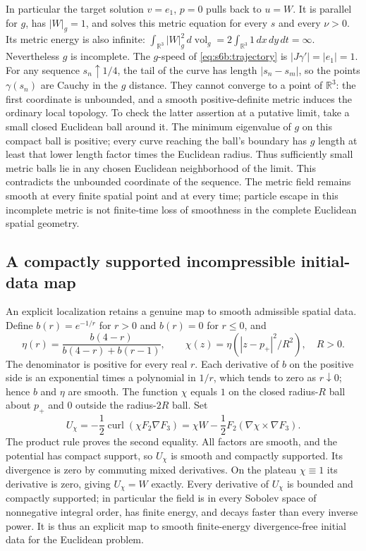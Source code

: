 In particular the target solution $v=e_1$, $p=0$ pulls back to $u=W$.
It is parallel for $g$, has $|W|_g=1$, and solves this metric equation for
every $s$ and every $\nu>0$.  Its metric energy is also infinite:
$\int_{\mathbb R^3}|W|_g^2\,d\operatorname{vol}_g
=2\int_{\mathbb R^3}1\,dx\,dy\,dt=\infty$.
Nevertheless $g$ is incomplete.  The
$g$-speed of \eqref{eq:s6b:trajectory} is
$|J\gamma'|=|e_1|=1$.  For any sequence $s_n\uparrow1/4$, the tail of
the curve has length $|s_n-s_m|$, so the points $\gamma(s_n)$ are Cauchy
in the $g$ distance.  They cannot converge to a point of $\mathbb R^3$:
the first coordinate is unbounded, and a smooth positive-definite metric
induces the ordinary local topology.  To check the latter assertion at a
putative limit, take a small closed Euclidean ball around it.  The minimum
eigenvalue of $g$ on this compact ball is positive; every curve reaching
the ball's boundary has $g$ length at least that lower length factor
times the Euclidean radius.  Thus sufficiently small metric balls lie
in any chosen Euclidean neighborhood of the limit.  This contradicts
the unbounded coordinate of the sequence.
The metric field remains smooth at every finite spatial point and at every
time; particle escape in this incomplete metric is not finite-time loss
of smoothness in the complete Euclidean spatial geometry.

\subsection{A compactly supported incompressible initial-data map}
An explicit localization retains a genuine map to smooth admissible spatial
data.  Define $b(r)=e^{-1/r}$ for $r>0$ and $b(r)=0$ for $r\le0$, and
\[
 \eta(r)=\frac{b(4-r)}{b(4-r)+b(r-1)},\qquad
 \chi(z)=\eta(|z-p_+|^2/R^2),\quad R>0.
\]
The denominator is positive for every real $r$.  Each derivative of $b$
on the positive side is an exponential times a polynomial in $1/r$,
which tends to zero as $r\downarrow0$; hence $b$ and $\eta$ are smooth.
The function $\chi$ equals $1$ on the closed radius-$R$ ball about $p_+$
and $0$ outside the radius-$2R$ ball.  Set
\begin{equation}
 U_\chi=-\frac12\operatorname{curl}(\chi F_2\nabla F_3)
 =\chi W-\frac12 F_2(\nabla\chi\times\nabla F_3).
 \label{eq:s6b:cutoff}
\end{equation}
The product rule proves the second equality.  All factors are smooth,
and the potential has compact support, so $U_\chi$ is smooth and compactly
supported.  Its divergence is zero by commuting mixed derivatives.
On the plateau $\chi\equiv1$ its derivative is zero, giving
$U_\chi=W$ exactly.  Every derivative of $U_\chi$ is bounded and
compactly supported; in particular the field is in every Sobolev space
of nonnegative integral order, has finite energy, and decays faster than
every inverse power.  It is thus an explicit map to smooth finite-energy
divergence-free initial data for the Euclidean problem.

